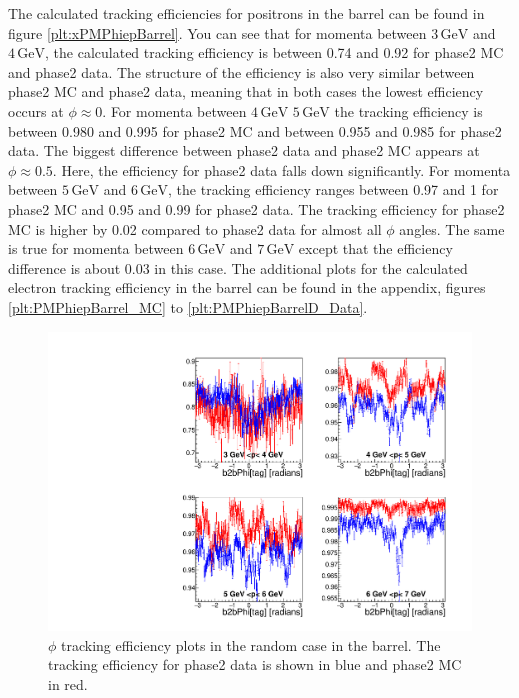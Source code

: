 \documentclass[a4paper,11pt,twosided,final,german,openbib,pdftex,listof=totoc,bibliography=totoc]{scrbook}
\begin{document}
The calculated tracking efficiencies for positrons in the barrel can be found in figure \ref{plt:xPMPhiepBarrel}. You can see that for momenta between $3\,\textrm{GeV}$ and $4\,\textrm{GeV}$, the calculated tracking efficiency is between 0.74 and 0.92 for phase2 MC and phase2 data. The structure of the efficiency is also very similar between phase2 MC and phase2 data, meaning that in both cases the lowest efficiency occurs at $\phi \approx 0$. For momenta between $4\,\textrm{GeV}$ $5\,\textrm{GeV}$ the tracking efficiency is between 0.980 and 0.995 for phase2 MC and between 0.955 and 0.985 for phase2 data. The biggest difference between phase2 data and phase2 MC appears at $\phi \approx 0.5$. Here, the efficiency for phase2 data falls down significantly. For momenta between $5\,\textrm{GeV}$ and $6\,\textrm{GeV}$, the tracking efficiency ranges between 0.97 and 1 for phase2 MC and 0.95  and 0.99 for phase2 data. The tracking efficiency for phase2 MC is higher by 0.02 compared to phase2 data for almost all $\phi$ angles. The same is true for momenta between $6\,\textrm{GeV}$ and $7\,\textrm{GeV}$ except that the efficiency difference is about 0.03 in this case.
The additional plots for the calculated electron tracking efficiency in the barrel can be found in the appendix, figures \ref{plt:PMPhiepBarrel_MC} to \ref{plt:PMPhiepBarrelD_Data}.




\begin{figure}[!htbp]
	\centering
	\includegraphics[width=\textwidth]{Plots/master/xPMPhiRandomBarrel}
	\caption[Momentum $\phi$ Random Barrel Efficiency Phase2]{$\phi$ tracking efficiency plots in the random case in the barrel. The tracking efficiency for phase2 data is shown in blue and phase2 MC in red.}
	\label{plt:xPMPhiRandomBarrel}
\end{figure}
\end{document}
